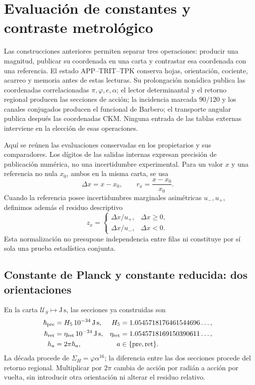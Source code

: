 \section{Evaluación de constantes y contraste metrológico}
\label{ii:sec:ii-contraste-cuantitativo}

Las construcciones anteriores permiten separar tres operaciones:
producir una magnitud, publicar su coordenada en una carta y contrastar esa
coordenada con una referencia. El estado APP--TRIT--TPK conserva hojas,
orientación, cociente, acarreo y memoria antes de estas lecturas. Su
prolongación nonádica publica las coordenadas correlacionadas
\(\pi,\varphi,e,\alpha\); el lector determinantal y el retorno regional
producen las secciones de acción; la incidencia marcada \(90/120\) y
los canales conjugados producen el funcional de Barbero; el transporte
angular publica después las coordenadas CKM. Ninguna entrada de las tablas
externas interviene en la elección de esas operaciones.

Aquí se reúnen las evaluaciones conservadas en los propietarios y sus
comparadores. Los dígitos de las salidas internas expresan precisión de
publicación numérica, no una incertidumbre experimental. Para un valor
\(x\) y una referencia no nula \(x_0\), ambos en la misma carta, se usa
\[
 \Delta x=x-x_0,\qquad r_x=\frac{x-x_0}{x_0}.
\]
Cuando la referencia posee incertidumbres marginales asimétricas
\(u_-,u_+\), definimos además el residuo descriptivo
\begin{equation}
 z_x=\begin{cases}
 \Delta x/u_+,&\Delta x\geq0,\\
 \Delta x/u_-,&\Delta x<0.
 \end{cases}
 \label{ii:eq:ii-residuo-marginal}
\end{equation}
Esta normalización no presupone independencia entre filas ni constituye
por sí sola una prueba estadística conjunta.

\subsection{Constante de Planck y constante reducida: dos orientaciones}

En la carta \(\mathcal U_S\mapsto\mathrm{J\,s}\), las secciones ya
construidas son
\begin{align}
 \hbar_{\rm pre}&=H_5\,10^{-34}\,\mathrm{J\,s},&
 H_5&=1.0545718176461544696\ldots,\\
 \hbar_{\rm ret}&=\eta_{\rm ret}\,10^{-34}\,\mathrm{J\,s},&
 \eta_{\rm ret}&=1.0545718169150390611\ldots,\\
 h_a&=2\pi\hbar_a,&a&\in\{\mathrm{pre},\mathrm{ret}\}.
 \label{ii:eq:ii-cuatro-coordenadas-planck}
\end{align}
La década procede de \(\Sigma_H=\varphi\alpha^{16}\); la diferencia entre
las dos secciones procede del retorno regional. Multiplicar por \(2\pi\)
cambia de acción por radián a acción por vuelta, sin introducir otra
orientación ni alterar el residuo relativo.

